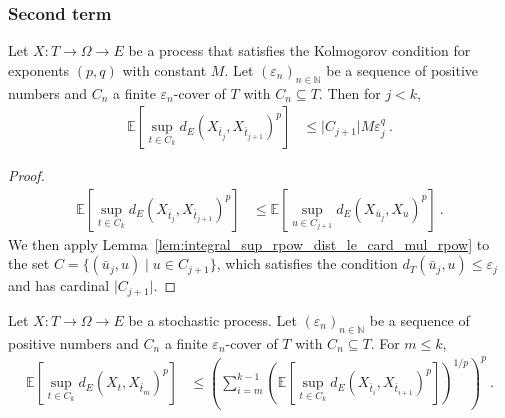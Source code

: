 \subsubsection{Second term}


\begin{lemma}\label{lem:integral_sup_rpow_dist_succ}
  \leanok
Let $X : T \to \Omega \to E$ be a process that satisfies the Kolmogorov condition for exponents $(p,q)$ with constant $M$.
Let $(\varepsilon_n)_{n \in \mathbb{N}}$ be a sequence of positive numbers and $C_n$ a finite $\varepsilon_n$-cover of $T$ with $C_n \subseteq T$.
Then for $j < k$,
\begin{align*}
  \mathbb{E}\left[\sup_{t \in C_k} d_E(X_{\bar{t}_j}, X_{\bar{t}_{j+1}})^p \right]
  &\le \vert C_{j+1} \vert M \varepsilon_j^q
  \: .
\end{align*}
\end{lemma}

\begin{proof}\leanok
\begin{align*}
  \mathbb{E}\left[\sup_{t \in C_k} d_E(X_{\bar{t}_j}, X_{\bar{t}_{j+1}})^p \right]
  &\le \mathbb{E}\left[\sup_{u \in C_{j+1}} d_E(X_{\bar{u}_j}, X_{u})^p \right]
  \: .
\end{align*}
We then apply Lemma~\ref{lem:integral_sup_rpow_dist_le_card_mul_rpow} to the set $C = \{(\bar{u}_j, u) \mid u \in C_{j+1}\}$, which satisfies the condition $d_T(\bar{u}_j, u) \le \varepsilon_j$ and has cardinal $\vert C_{j+1} \vert$.
\end{proof}


\begin{lemma}\label{lem:integral_sup_dist_le_sum_rpow}
  \leanok
Let $X : T \to \Omega \to E$ be a stochastic process.
Let $(\varepsilon_n)_{n \in \mathbb{N}}$ be a sequence of positive numbers and $C_n$ a finite $\varepsilon_n$-cover of $T$ with $C_n \subseteq T$.
For $m \le k$,
\begin{align*}
  \mathbb{E}\left[\sup_{t \in C_k} d_E(X_t, X_{\bar{t}_m})^p \right]
  &\le \left(\sum_{i=m}^{k-1} \left( \mathbb{E}\left[\sup_{t \in C_k} d_E(X_{\bar{t}_i}, X_{\bar{t}_{i+1}})^p\right] \right)^{1/p}\right)^p
  \: .
\end{align*}
\end{lemma}

